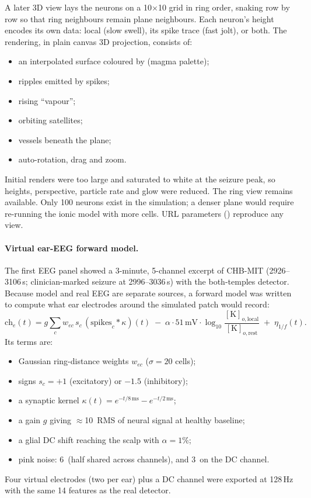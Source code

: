 A later 3D view lays the neurons on a 10$\times$10 grid in ring order, snaking row by row so that ring neighbours remain plane neighbours. Each neuron's height encodes its own data: local \Ko{} (slow swell), its spike trace (fast jolt), or both. The rendering, in plain canvas 3D projection, consists of:
\begin{itemize}
\item an interpolated surface coloured by \Kp{} (magma palette);
\item ripples emitted by spikes;
\item rising \Kp{} ``vapour'';
\item orbiting \Clm{} satellites;
\item vessels beneath the plane;
\item auto-rotation, drag and zoom.
\end{itemize}
Initial renders were too large and saturated to white at the seizure peak, so heights, perspective, particle rate and glow were reduced. The ring view remains available. Only 100 neurons exist in the simulation; a denser plane would require re-running the ionic model with more cells. URL parameters () reproduce any view.

\paragraph{Virtual ear-EEG forward model.} The first EEG panel showed a 3-minute, 5-channel excerpt of CHB-MIT  (2926--3106\,s; clinician-marked seizure at 2996--3036\,s) with the both-temples detector. Because model and real EEG are separate sources, a forward model was written to compute what ear electrodes around the simulated patch would record:
\begin{equation}
\mathrm{ch}_e(t) = g\sum_c w_{ec}\,s_c\,(\mathrm{spikes}_c * \kappa)(t) \;-\; \alpha\cdot51\,\mathrm{mV}\cdot\log_{10}\frac{[\mathrm K]_{o,\mathrm{local}}}{[\mathrm K]_{o,\mathrm{rest}}} \;+\; \eta_{1/f}(t).
\end{equation}
Its terms are:
\begin{itemize}
\item Gaussian ring-distance weights $w_{ec}$ ($\sigma=20$ cells);
\item signs $s_c=+1$ (excitatory) or $-1.5$ (inhibitory);
\item a synaptic kernel $\kappa(t)=e^{-t/8\,\mathrm{ms}}-e^{-t/2\,\mathrm{ms}}$;
\item a gain $g$ giving $\approx$10\,\uV{} RMS of neural signal at healthy baseline;
\item a glial \Kp{} DC shift reaching the scalp with $\alpha=1$\%;
\item pink noise: 6\,\uV{} (half shared across channels), and 3\,\uV{} on the DC channel.
\end{itemize}
Four virtual electrodes (two per ear) plus a DC channel were exported at 128\,Hz with the same 14 features as the real detector.

